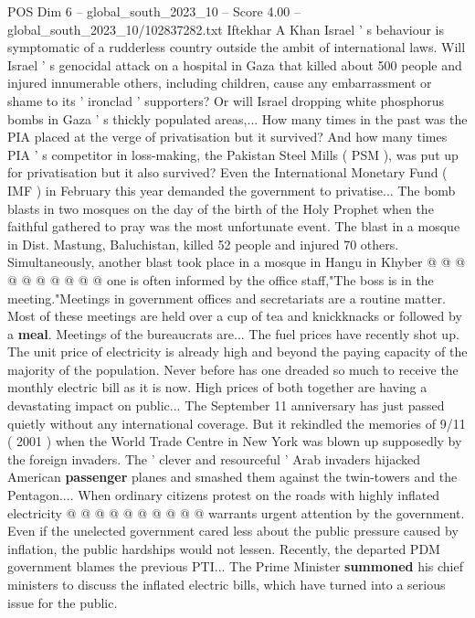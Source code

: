 \begin{textsample}{POS Dim 6 – global\_south\_2023\_10 – Score 4.00 – global\_south\_2023\_10/102837282.txt}  \label{ex:f6_pos_246}
Iftekhar A Khan Israel ' s behaviour is symptomatic of a rudderless country outside the ambit of international laws.
Will Israel ' s genocidal attack on a hospital in Gaza that killed about 500 people and injured innumerable others, including children, cause any embarrassment or shame to its ' ironclad ' supporters?
Or will Israel dropping white phosphorus bombs in Gaza ' s thickly populated areas,...
How many times in the past was the PIA placed at the verge of privatisation but it survived?
And how many times PIA ' s competitor in loss-making, the Pakistan Steel Mills ( PSM ), was put up for privatisation but it also survived?
Even the International Monetary Fund ( IMF ) in February this year demanded the government to privatise...
The bomb blasts in two mosques on the day of the birth of the Holy Prophet when the faithful gathered to pray was the most unfortunate event.
The blast in a mosque in Dist.
Mastung, Baluchistan, killed 52 people and injured 70 others.
Simultaneously, another blast took place in a mosque in Hangu in Khyber @ @ @ @ @ @ @ @ @ @ one is often informed by the office staff,"The boss is in the meeting."Meetings in government offices and secretariats are a routine matter.
Most of these meetings are held over a cup of tea and knickknacks or followed by a \textbf{meal}.
Meetings of the bureaucrats are...
The fuel prices have recently shot up.
The unit price of electricity is already high and beyond the paying capacity of the majority of the population.
Never before has one dreaded so much to receive the monthly electric bill as it is now.
High prices of both together are having a devastating impact on public...
The September 11 anniversary has just passed quietly without any international coverage.
But it rekindled the memories of 9/11 ( 2001 ) when the World Trade Centre in New York was blown up supposedly by the foreign invaders.
The ' clever and resourceful ' Arab invaders hijacked American \textbf{passenger} planes and smashed them against the twin-towers and the Pentagon....
When ordinary citizens protest on the roads with highly inflated electricity @ @ @ @ @ @ @ @ @ @ warrants urgent attention by the government.
Even if the unelected government cared less about the public pressure caused by inflation, the public hardships would not lessen.
Recently, the departed PDM government blames the previous PTI...
The Prime Minister \textbf{summoned} his chief ministers to discuss the inflated electric bills, which have turned into a serious issue for the public.

\end{textsample}
